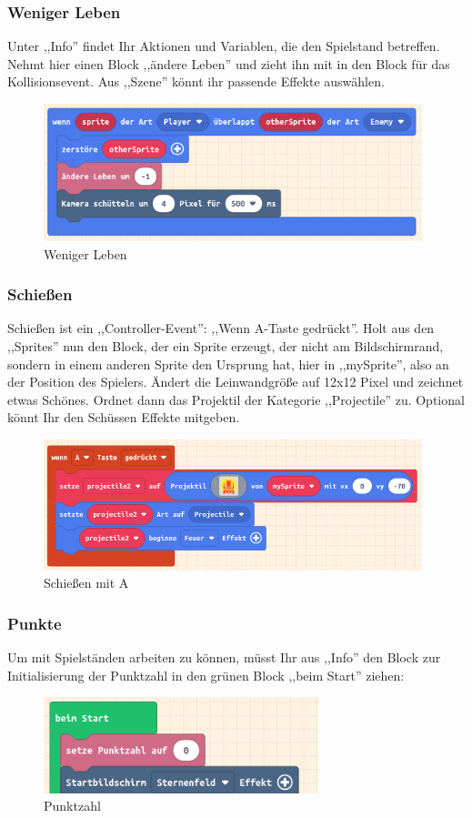 \documentclass{beamer}
\begin{document}
 \begin{frame}
 \frametitle{Weniger Leben}
Unter ,,Info'' findet Ihr Aktionen und Variablen, die den Spielstand betreffen. Nehmt hier einen Block ,,ändere Leben'' und zieht ihn mit in den Block für das Kollisionsevent. Aus ,,Szene'' könnt ihr passende Effekte auswählen.
 
 \begin{figure}
  \includegraphics[width=11cm]{game06.png}
  \caption{Weniger Leben}
  \label{fig:game4}
\end{figure}
\end{frame}


 \begin{frame}
 \frametitle{Schießen}
Schießen ist ein ,,Controller-Event'': ,,Wenn A-Taste gedrückt''. Holt aus den ,,Sprites'' nun den Block, der ein Sprite erzeugt, der nicht am Bildschirmrand, sondern in einem anderen Sprite den Ursprung hat, hier in ,,mySprite'', also an der Position des Spielers. Ändert die Leinwandgröße auf 12x12 Pixel und zeichnet etwas Schönes. Ordnet dann das Projektil der Kategorie ,,Projectile'' zu. Optional könnt Ihr den Schüssen Effekte mitgeben. 
 
 \begin{figure}
  \includegraphics[width=11cm]{game07.png}
  \caption{Schießen mit A}
  \label{fig:game4}
\end{figure}
\end{frame}

 \begin{frame}
 \frametitle{Punkte}
Um mit Spielständen arbeiten zu können, müsst Ihr aus ,,Info'' den Block zur Initialisierung der Punktzahl in den grünen Block ,,beim Start'' ziehen:
 
 \begin{figure}
  \includegraphics[width=8cm]{game08.png}
  \caption{Punktzahl}
  \label{fig:game4}
\end{figure}
\end{frame}
\end{document}
